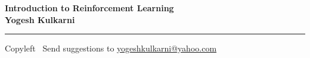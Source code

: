 
\graphicspath{{images/}}

\footnotesize


\begin{center}
\Large{\textbf{Introduction to Reinforcement Learning\\ Yogesh Kulkarni}}  
\end{center}

\begin{multicols}{2}

\end{multicols}

\rule{\linewidth}{0.25pt}
\scriptsize
Copyleft \textcopyleft\  Send suggestions to 
\href{http://www.yogeshkulkarni.com}{yogeshkulkarni@yahoo.com}


